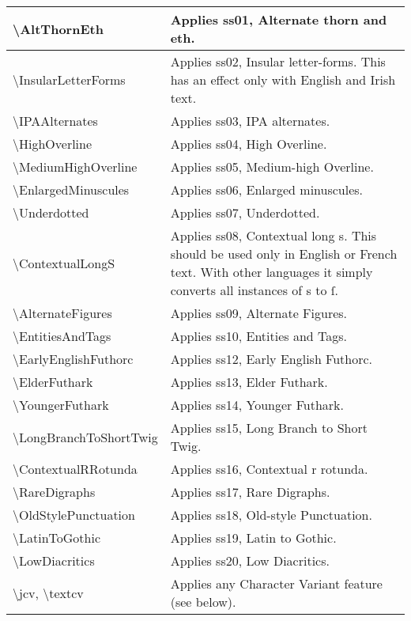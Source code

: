 \documentclass{article}
\begin{document}
\begin{center}
\tablehead{\hline}
\tabletail{\hline}
\begin{supertabular}{| l | p{2.75in} |}
\textbackslash AltThornEth & Applies ss01, Alternate thorn and eth.\\\hline
\textbackslash InsularLetterForms & Applies ss02, Insular letter-forms.
This has an effect only with English and Irish text.\\\hline
\textbackslash IPAAlternates & Applies ss03, IPA alternates.\\\hline
\textbackslash HighOverline & Applies ss04, High Overline.\\\hline
\textbackslash MediumHighOverline & Applies ss05, Medium-high Overline.\\\hline
\textbackslash EnlargedMinuscules & Applies ss06, Enlarged minuscules.\\\hline
\textbackslash Underdotted & Applies ss07, Underdotted.\\\hline
\textbackslash ContextualLongS & Applies ss08, Contextual long s. This should be used only in English or
French text. With other languages it simply converts all instances of s to ſ.\\\hline
\textbackslash AlternateFigures & Applies ss09, Alternate Figures.\\\hline
\textbackslash EntitiesAndTags & Applies ss10, Entities and Tags.\\\hline
\textbackslash EarlyEnglishFuthorc & Applies ss12, Early English Futhorc.\\\hline
\textbackslash ElderFuthark & Applies ss13, Elder Futhark.\\\hline
\textbackslash YoungerFuthark & Applies ss14, Younger Futhark.\\\hline
\textbackslash LongBranchToShortTwig & Applies ss15, Long Branch to Short Twig.\\\hline
\textbackslash ContextualRRotunda & Applies ss16, Contextual r rotunda.\\\hline
\textbackslash RareDigraphs & Applies ss17, Rare Digraphs.\\\hline
\textbackslash OldStylePunctuation & Applies ss18, Old-style Punctuation.\\\hline
\textbackslash LatinToGothic & Applies ss19, Latin to Gothic.\\\hline
\textbackslash LowDiacritics & Applies ss20, Low Diacritics.\\\hline
\textbackslash jcv, \textbackslash textcv & Applies any Character Variant feature (see below).\\
\end{supertabular}
\end{center}
\end{document}
